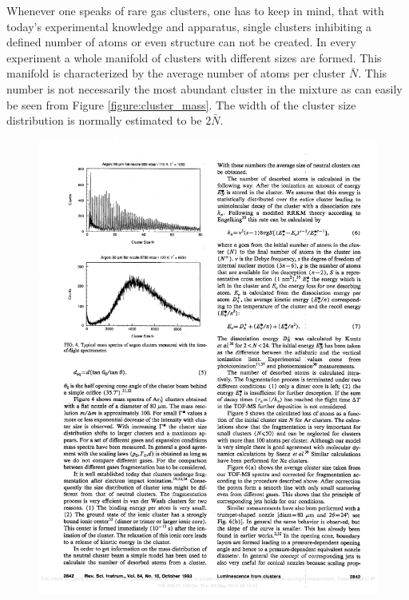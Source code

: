 Whenever one speaks of rare gas clusters, one has to keep in mind, that
with today's experimental knowledge and apparatus, single clusters
inhibiting a defined number of atoms or even structure can not be created.
In every experiment a whole manifold of clusters with different sizes are
formed. This manifold is characterized by the average number of atoms
per cluster $\bar{N}$. This number is not necessarily the most abundant
cluster in the mixture as can easily be seen from
Figure \ref{figure:cluster_mass}.
The width of the cluster size distribution is normally estimated to be
$2\bar{N}$.

\begin{figure}[h]
  \centering
  \includegraphics[scale=1.0]{pics/exp_clusters1.pdf}

\end{figure}
